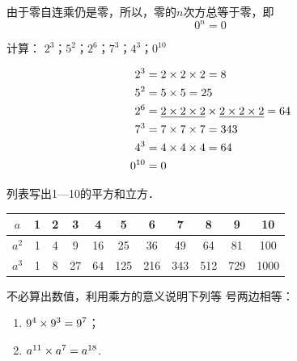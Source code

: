 由于零自连乘仍是零，所以，零的$n$次方总等于零，即
\[0^n=0 \]

\begin{example}
	计算：
	$2^3$；$5^2$；$2^6$；$7^3$；$4^3 $；$0^{10}$
\end{example}

\begin{solution}
	\[\begin{split}
	2^3&=2\times2\times2=8\\
	5^2&=5\times5=25\\
	2^6&=\underline{2\times2\times2}\times\underline{2\times2\times2}=64\\
	7^3&=7\times7\times7=343\\
	4^3&=4\times4\times4=64\\
	0^{10}&=0
	\end{split}\]
\end{solution}

\begin{example}
	列表写出1—10的平方和立方．
\end{example}

\begin{solution}
	\begin{center}
		\begin{tabular}{c|cccccccccc}
			\hline
			$a$ & 1&2&3&4&5&6&7&8&9&10\\
			\hline
			$a^2$&1&4&9&16&25&36&49&64&81&100\\
			$a^3$&1&8&27&64&125&216&343&512&729&1000\\
			\hline
		\end{tabular}
	\end{center}
\end{solution}

\begin{example}
	不必算出数值，利用乘方的意义说明下列等
	号两边相等：
	\begin{enumerate}
		\item $9^4\times9^3=9^7$；
		\item $a^{11}\times a^7=a^{18}$.
	\end{enumerate}
\end{example}

